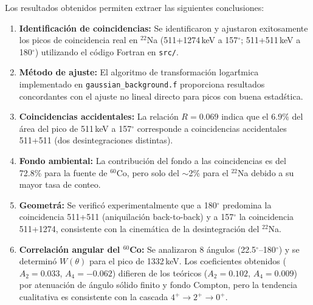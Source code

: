\documentclass[12pt,a4paper]{article}
\begin{document}
Los resultados obtenidos permiten extraer las siguientes conclusiones:

\begin{enumerate}
  \item \textbf{Identificaci\'on de coincidencias:} Se identificaron y ajustaron
        exitosamente los picos de coincidencia real en $^{22}$Na (511+1274\,keV a 157$^\circ$;
        511+511\,keV a 180$^\circ$) utilizando el c\'odigo Fortran en \texttt{src/}.
  \item \textbf{M\'etodo de ajuste:} El algoritmo de transformaci\'on logar\'tmica
        implementado en \texttt{gaussian\_background.f} proporciona resultados concordantes
        con el ajuste no lineal directo para picos con buena estad\'stica.
  \item \textbf{Coincidencias accidentales:} La relaci\'on $R = 0.069$ indica que
        el 6.9\% del \'area del pico de 511\,keV a 157$^\circ$ corresponde a
        coincidencias accidentales 511+511 (dos desintegraciones distintas).
  \item \textbf{Fondo ambiental:} La contribuci\'on del fondo a las coincidencias es del
        72.8\% para la fuente de $^{60}$Co, pero solo del $\sim$2\% para el $^{22}$Na
        debido a su mayor tasa de conteo.
  \item \textbf{Geometr\'a:} Se verific\'o experimentalmente que a 180$^\circ$ predomina
        la coincidencia 511+511 (aniquilaci\'on back-to-back) y a 157$^\circ$ la
        coincidencia 511+1274, consistente con la cinem\'atica de la desintegraci\'on
        del $^{22}$Na.
  \item \textbf{Correlaci\'on angular del $^{60}$Co:} Se analizaron 8 \'angulos
        (22.5$^\circ$--180$^\circ$) y se determin\'o $W(\theta)$ para el pico de
        1332\,keV. Los coeficientes obtenidos ($A_2 = 0.033$, $A_4 = -0.062$)
        difieren de los te\'oricos ($A_2=0.102$, $A_4=0.009$) por atenuaci\'on
        de \'angulo s\'olido finito y fondo Compton, pero la tendencia
        cualitativa es consistente con la cascada $4^+ \to 2^+ \to 0^+$.
\end{enumerate}
\end{document}
